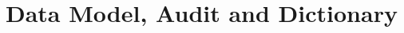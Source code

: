 \documentclass[11pt,a4paper]{article}
\begin{document}



\label{sec:bodyend}
\newpage


\newpage
\appendix

\section{Data Model, Audit and Dictionary}
\label{app:dictionary}
\end{document}
